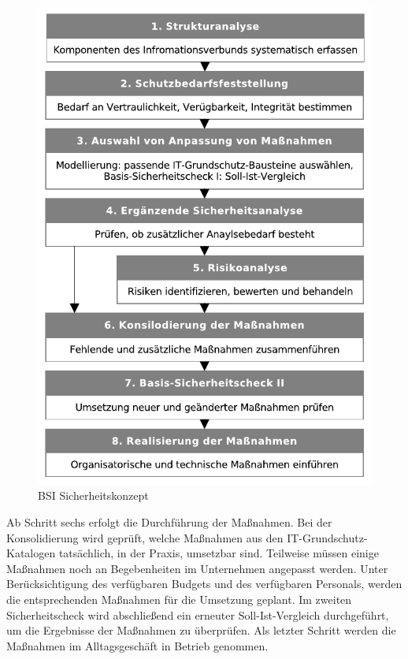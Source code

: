 \documentclass[11pt,a4paper]{report}
\begin{document}
\begin{figure}[htb]
\centering
\includegraphics[scale=0.7]{images/bsi_sicherheitskonzept.pdf}
\caption[BSI Sicherheitskonzept]{BSI Sicherheitskonzept\footnotemark}
\label{fig:bsi_sicherheit}
\end{figure}

Ab Schritt sechs erfolgt die Durchführung der Maßnahmen. Bei der Konsolidierung wird geprüft, welche Maßnahmen aus den IT-Grundschutz-Katalogen tatsächlich, in der Praxis, umsetzbar sind. Teilweise müssen einige Maßnahmen noch an Begebenheiten im Unternehmen angepasst werden. Unter Berücksichtigung des verfügbaren Budgets und des verfügbaren Personals, werden die entsprechenden Maßnahmen für die Umsetzung geplant. Im zweiten Sicherheitscheck wird abschließend ein erneuter Soll-Ist-Vergleich durchgeführt, um die Ergebnisse der Maßnahmen zu überprüfen. Als letzter Schritt werden die Maßnahmen im Alltagsgeschäft in Betrieb genommen.
\end{document}

